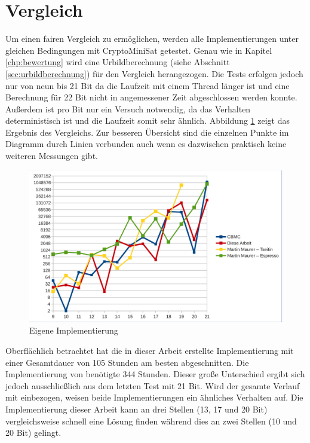\section{Vergleich}
\label{sec:vergleich}

Um einen fairen Vergleich zu ermöglichen, werden alle Implementierungen unter gleichen Bedingungen mit CryptoMiniSat
getestet. Genau wie in Kapitel \ref{chp:bewertung} wird eine Urbildberechnung (siehe Abschnitt \ref{sec:urbildberechnung})
für den Vergleich herangezogen. Die Tests erfolgen jedoch nur von neun bis 21 Bit da die Laufzeit mit einem Thread länger
ist und eine Berechnung für 22 Bit nicht in angemessener Zeit abgeschlossen werden konnte. Außerdem ist pro Bit nur ein
Versuch notwendig, da das Verhalten deterministisch ist und die Laufzeit somit sehr ähnlich. Abbildung \ref{fig:eval_final}
zeigt das Ergebnis des Vergleichs. Zur besseren Übersicht sind die einzelnen Punkte im Diagramm durch Linien verbunden auch
wenn es dazwischen praktisch keine weiteren Messungen gibt.
\begin{figure}[!h]
  \centering
  \includegraphics[scale=0.55]{images/eval_final}
  \caption{Eigene Implementierung}
  \label{fig:eval_final}
\end{figure}

Oberflächlich betrachtet hat die in dieser Arbeit erstellte Implementierung mit einer Gesamtdauer von 105 Stunden am besten abgeschnitten.
Die Implementierung von  benötigte 344 Stunden. Dieser große Unterschied ergibt sich jedoch ausschließlich aus dem
letzten Test mit 21 Bit. Wird der gesamte Verlauf mit einbezogen, weisen beide Implementierungen ein ähnliches Verhalten auf. Die
Implementierung dieser Arbeit kann an drei Stellen (13, 17 und 20 Bit) vergleichsweise schnell eine Lösung finden während  dies
an zwei Stellen (10 und 20 Bit) gelingt.

